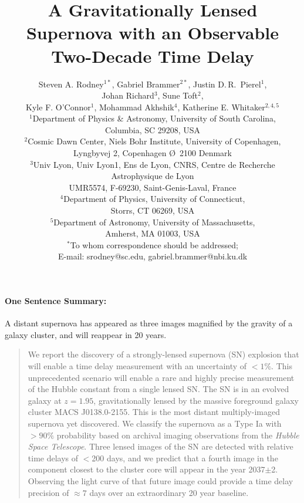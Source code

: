 \documentclass[12pt]{article}
\title{A Gravitationally Lensed Supernova with an Observable Two-Decade Time Delay}
\author{
 Steven A. Rodney$^{1\ast}$, 
 Gabriel Brammer$^{2\ast}$,  
 Justin D.\,R.~Pierel$^{1}$,\\ 
 Johan Richard$^{3}$, 
 Sune Toft$^{2}$,\\  
 Kyle F. O'Connor$^{1}$, 
 Mohammad Akhshik$^{4}$, 
 Katherine E. Whitaker$^{2,4,5}$  
\\
\normalsize{$^{1}$Department of Physics \& Astronomy, University of South Carolina,}\\ \normalsize{ Columbia, SC 29208, USA}\\
\normalsize{$^{2}$Cosmic Dawn Center, Niels Bohr Institute, University of Copenhagen,}\\ \normalsize{Lyngbyvej 2, Copenhagen \O\ 2100 Denmark}\\
\normalsize{$^{3}$Univ Lyon, Univ Lyon1, Ens de Lyon, CNRS, Centre de Recherche Astrophysique de Lyon}\\ \normalsize{UMR5574, F-69230, Saint-Genis-Laval, France}\\
\normalsize{$^{4}$Department of Physics, University of Connecticut,}\\ \normalsize{Storrs, CT 06269, USA}\\
\normalsize{$^{5}$Department of Astronomy, University of Massachusetts,}\\ \normalsize{Amherst, MA 01003, USA}\\
\normalsize{$^\ast$To whom correspondence should be addressed;}\\ \normalsize{E-mail:  srodney@sc.edu, gabriel.brammer@nbi.ku.dk}
}
\date{}
\newenvironment{sciabstract}{%
\begin{quote} \bf}
{\end{quote}}
\begin{document}
 


\baselineskip24pt


\maketitle 

\paragraph*{One Sentence Summary:} A distant supernova has appeared as three images magnified by the gravity of a galaxy cluster, and will reappear in 20 years.


\begin{sciabstract}

  We report the discovery of a strongly-lensed supernova (SN) explosion that will enable a time delay measurement with an uncertainty of $<1\%$. This unprecedented scenario will enable a rare and highly precise measurement of the Hubble constant from a single lensed SN.  The SN is in an evolved galaxy at $z=1.95$, gravitationally lensed by the massive foreground galaxy cluster MACS J0138.0-2155.  This is the most distant multiply-imaged supernova yet discovered.  We classify the supernova as a Type Ia with {$>90\%$} probability based on archival imaging observations from the \textit{Hubble Space Telescope}.  Three lensed images of the SN are detected with relative time delays of $<$200 days, and we predict that a fourth image in the component closest to the cluster core will appear in the year 2037$\pm$2.  Observing the light curve of that future image could provide a time delay precision of $\approx 7$ days over an extraordinary 20 year baseline. 

\end{sciabstract}


\end{document}
